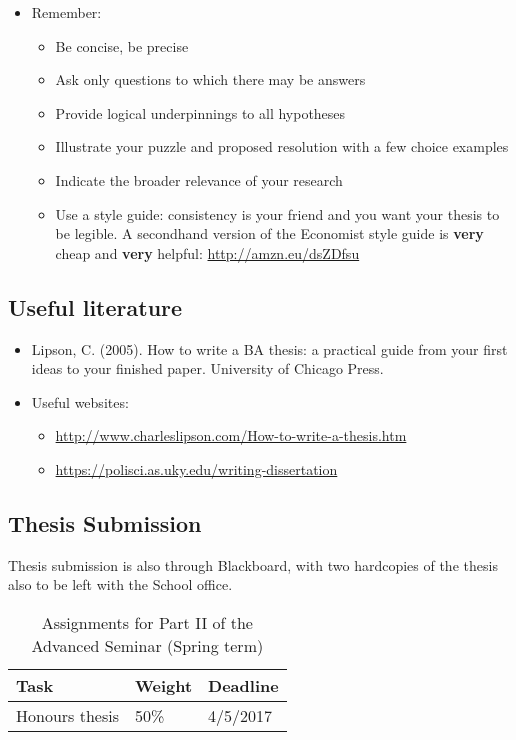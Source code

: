 \documentclass[a4paper,12pt]{article}
\begin{document}
\begin{itemize}
	\item Remember:
	\begin{itemize}
		\item Be concise, be precise
		\item Ask only questions to which there may be answers
		\item Provide logical underpinnings to all hypotheses
		\item Illustrate your puzzle and proposed resolution with a few choice examples
		\item Indicate the broader relevance of your research
		\item Use a style guide: consistency is your friend and you want your thesis to be legible. A secondhand version of the Economist style guide is \textbf{very} cheap and \textbf{very} helpful: \url{http://amzn.eu/dsZDfsu}
	\end{itemize}
\end{itemize}


\subsection*{Useful literature}

\begin{itemize}
	\item Lipson, C. (2005). How to write a BA thesis: a practical guide from your first ideas to your finished paper. University of Chicago Press.
	\item Useful websites:
	\begin{itemize}
		\item \url{http://www.charleslipson.com/How-to-write-a-thesis.htm}
		\item \url{https://polisci.as.uky.edu/writing-dissertation}
	\end{itemize}
\end{itemize}


\subsection*{Thesis Submission}

	Thesis submission is also through Blackboard, with two hardcopies of the thesis also to be left with the School office.

\begin{table}[ht]
	\centering
	\begin{tabular}{lll}
		\hline
		Task & Weight & Deadline \\
		\hline
		Honours thesis & 50\% & 4/5/2017 \\
		\hline
	\end{tabular}
	\caption{Assignments for Part II of the Advanced Seminar (Spring term)}
\end{table}
\end{document}

